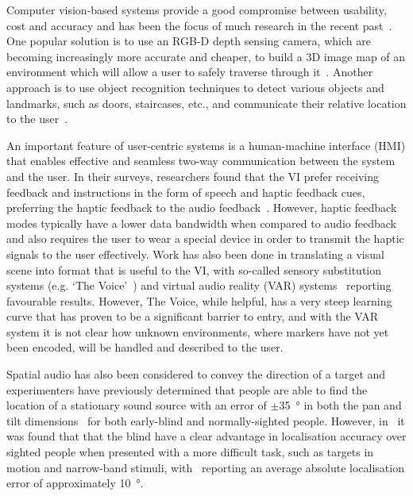 \documentclass[format=sigconf, review=true, screen=true, anonymous=true]{acmart}
\begin{document}
Computer vision-based systems provide a good compromise between usability, cost and accuracy and has been the focus of much research in the recent past~\cite{manduchi2014last}. One popular solution is to use an RGB-D depth sensing camera, which are becoming increasingly more accurate and cheaper, to build a 3D image map of an environment which will allow a user to safely traverse through it~\cite{lee2015, rodriguez2012obstacle}. Another approach is to use object recognition techniques to detect various objects and landmarks, such as doors, staircases, etc., and communicate their relative location to the user~\cite{tian2013b}.

An important feature of user-centric systems is a human-machine interface (HMI) that enables effective and seamless two-way communication between the system and the user. In their surveys, researchers found that the VI prefer receiving feedback and instructions in the form of speech and haptic feedback cues, preferring the haptic feedback to the audio feedback~\cite{khoo2016multimodal, ross2000wearable}. However, haptic feedback modes typically have a lower data bandwidth when compared to audio feedback and also requires the user to wear a special device in order to transmit the haptic signals to the user effectively. Work has also been done in translating a visual scene into format that is useful to the VI, with so-called sensory substitution systems (e.g. `The Voice'~\cite{meijer2010}) and virtual audio reality (VAR) systems~\cite{frauenberger2003} reporting favourable results. However, The Voice, while helpful, has a very steep learning curve that has proven to be a significant barrier to entry, and with the VAR system it is not clear how unknown environments, where markers have not yet been encoded, will be handled and described to the user. 

Spatial audio has also been considered to convey the direction of a target and experimenters have previously determined that people are able to find the location of a stationary sound source with an error of $\pm$\SI{35}{\degree} in both the pan and tilt dimensions~\cite{zwiers2001spatial} for both early-blind and normally-sighted people. However, in~\cite{lewald2013exceptional, lessard1998early} it was found that that the blind have a clear advantage in localisation accuracy over sighted people when presented with a more difficult task, such as targets in motion and narrow-band stimuli, with~\cite{lewald2013exceptional} reporting an average absolute localisation error of approximately \SI{10}{\degree}. 
\end{document}
